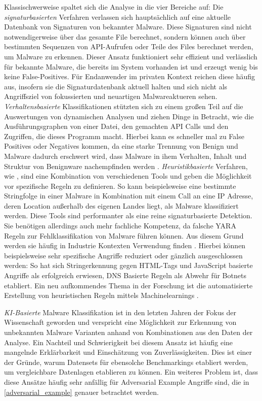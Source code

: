 Klassischwerweise spaltet sich die Analyse in die vier Bereiche auf: 
Die \textit{signaturbasierten} Verfahren verlassen sich hauptsächlich auf eine aktuelle Datenbank von Signaturen von bekannter Malware. Diese Signaturen sind nicht notwendigerweise über das gesamte File berechnet, sondern können auch über bestimmten Sequenzen von API-Aufrufen oder Teile des Files berechnet werden, um Malware zu erkennen. Dieser Ansatz funktioniert sehr effizient und verlässlich für bekannte Malware, die bereits im System vorhanden ist und erzeugt wenig bis keine False-Positives. Für Endanwender im privaten Kontext reichen diese häufig aus, insofern sie die Signaturdatenbank aktuell halten und sich nicht als Angriffsziel von fokussierten und neuartigen Malwareaktueren sehen. 
\textit{Verhaltensbasierte} Klassifikationen stützten sich zu einem großen Teil auf die Auswertungen von dynamischen Analysen und ziehen Dinge in Betracht, wie die Ausführungsgraphen von einer Datei, den gemachten API Calls und den Zugriffen, die dieses Programm macht. Hierbei kann es schneller mal zu False Positives oder Negatives kommen, da eine starke Trennung von Benign und Malware dadurch erschwert wird, dass Malware in ihem Verhalten, Inhalt und Struktur von Benignware nachempfinden werden\cite{rathore_2023_breaking} .
\textit{Heuristikbasierte} Verfahren, wie \cite{yara}, sind eine Kombination von verschiedenen Tools und geben die Möglichkeit vor spezifische Regeln zu definieren. So kann beispielsweise eine bestimmte Stringfolge in einer Malware in Kombination mit einem Call an eine IP Adresse, deren Location außerhalb des eigenen Landes liegt, als Malware klassifiziert werden. Diese Tools sind performanter als eine reine signaturbasierte Detektion. Sie benötigen allerdings auch mehr fachliche Kompetenz, da falsche YARA Regeln zur Fehlklassifikation von Malware führen können. Aus diesem Grund werden sie häufig in Industrie Kontexten Verwendung finden \cite{lockett_2021_assessing,yara}. Hierbei können beispielsweise sehr spezifische Angriffe reduziert oder gänzlich ausgeschlossen werden: So hat sich Stringerkennung gegen HTML-Tags und JavaScript basierte Angriffe als erfolgreich erwiesen, DNS Basierte Regeln als Abwehr für Botnets etabliert. Ein neu aufkommendes Thema in der Forschung ist die automatisierte Erstellung von heuristischen Regeln mittels Machinelearnings \cite{li_2024_automatically}.

\textit{KI-Basierte} Malware Klassifikation ist in den letzten Jahren der Fokus der Wissenschaft geworden \cite{fatemehdeldar_2023_deep, pascalmaniriho_2023_apimaldetect} und verspricht eine Möglichkeit zur Erkennung von unbekannten Malware Varianten anhand von Kombinationen aus den Daten der Analyse. Ein Nachteil und Schwierigkeit bei diesem Ansatz ist häufig eine mangelnde Erklärbarkeit und Einschätzung von Zuverlässigkeiten. Dies ist einer der Gründe, warum \cite{jiang_2024_benchmfc} Datensets für ebensolche Benchmarkings etabliert werden, um vergleichbare Datenlagen etablieren zu können. Ein weiteres Problem ist, dass diese Ansätze häufig sehr anfällig für Adversarial Example Angriffe sind, die in \ref{adversarial_example} genauer betrachtet werden.